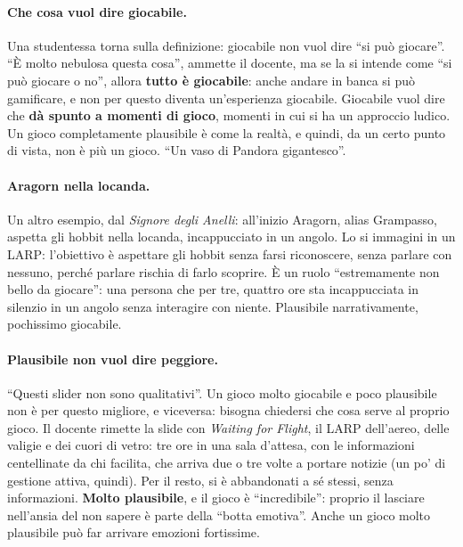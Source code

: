 \paragraph{Che cosa vuol dire giocabile.} Una studentessa torna sulla definizione:
giocabile non vuol dire ``si può giocare''. ``È molto nebulosa questa cosa'',
ammette il docente, ma se la si intende come ``si può giocare o no'', allora
\textbf{tutto è giocabile}: anche andare in banca si può gamificare, e non per
questo diventa un'esperienza giocabile. Giocabile vuol dire che \textbf{dà
spunto a momenti di gioco}, momenti in cui si ha un approccio ludico. Un gioco
completamente plausibile è come la realtà, e quindi, da un certo punto di vista,
non è più un gioco. ``Un vaso di Pandora gigantesco''.

\paragraph{Aragorn nella locanda.} Un altro esempio, dal \emph{Signore degli
Anelli}: all'inizio Aragorn, alias Grampasso, aspetta gli hobbit nella locanda,
incappucciato in un angolo. Lo si immagini in un LARP: l'obiettivo è aspettare gli
hobbit senza farsi riconoscere, senza parlare con nessuno, perché parlare
rischia di farlo scoprire. È un ruolo ``estremamente non bello da giocare'': una
persona che per tre, quattro ore sta incappucciata in silenzio in un angolo senza
interagire con niente. Plausibile narrativamente, pochissimo giocabile.

\paragraph{Plausibile non vuol dire peggiore.} ``Questi slider non sono
qualitativi''. Un gioco molto giocabile e poco plausibile non è per questo
migliore, e viceversa: bisogna chiedersi che cosa serve al proprio gioco. Il
docente rimette la slide con \emph{Waiting for Flight}, il LARP dell'aereo, delle
valigie e dei cuori di vetro: tre ore in una sala d'attesa, con le informazioni
centellinate da chi facilita, che arriva due o tre volte a portare notizie (un
po' di gestione attiva, quindi). Per il resto, si è abbandonati a sé stessi,
senza informazioni. \textbf{Molto plausibile}, e il gioco è ``incredibile'':
proprio il lasciare nell'ansia del non sapere è parte della ``botta emotiva''.
Anche un gioco molto plausibile può far arrivare emozioni fortissime.

